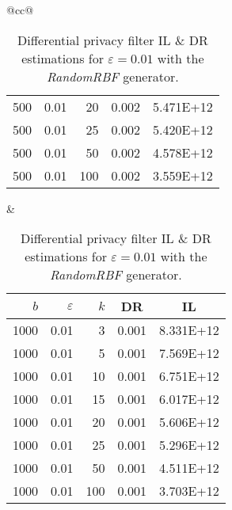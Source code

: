 \begin{table}[H]
\begin{tabular}{@{}cc@{}}
\begin{tabular}{@{}rrrrr@{}}
			500	&	0.01	&	20	&	0.002	&	5.471E+12 \\
			500	&	0.01	&	25	&	0.002	&	5.420E+12 \\
			500	&	0.01	&	50	&	0.002	&	4.578E+12 \\
			500	&	0.01	&	100	&	0.002	&	3.559E+12 \\
		\end{tabular}
		&
		\begin{tabular}{@{}rrrrr@{}}
			\toprule
			$b$ & $\varepsilon$ & $k$ & \multicolumn{1}{c}{DR} & \multicolumn{1}{c}{IL} \\ \midrule
			1000	&	0.01	&	3	&	0.001	&	8.331E+12 \\
			1000	&	0.01	&	5	&	0.001	&	7.569E+12 \\
			1000	&	0.01	&	10	&	0.001	&	6.751E+12 \\
			1000	&	0.01	&	15	&	0.001	&	6.017E+12 \\
			1000	&	0.01	&	20	&	0.001	&	5.606E+12 \\
			1000	&	0.01	&	25	&	0.001	&	5.296E+12 \\
			1000	&	0.01	&	50	&	0.001	&	4.511E+12 \\
			1000	&	0.01	&	100	&	0.001	&	3.703E+12 \\
		\end{tabular}
	\end{tabular}
	\caption[Differential privacy filter DR \& IL estimations (RandomRBF), $\varepsilon = 0.01$.]{Differential privacy filter IL \& DR estimations for $\varepsilon = 0.01$ with the \textit{RandomRBF} generator.}
	\label{table:results-wave-diff-priv-e0.01}
\end{table}

